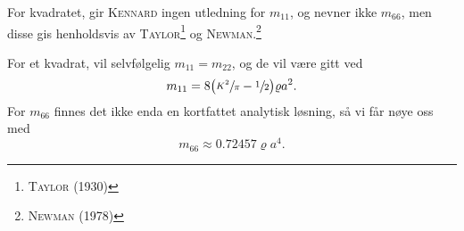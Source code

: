 For kvadratet, gir \textsc{Kennard} ingen utledning for $m_{11}$, og nevner ikke $m_{66}$, men disse gis henholdsvis av \textsc{Taylor}\footnote{\cite{taylor1930some} \textsc{Taylor} (1930)} og \textsc{Newman}.\footnote{\cite{newman1979added} \textsc{Newman} (1978)}

\vspace{2em}
For et kvadrat, vil selvfølgelig $m_{11} = m_{22}$, og de vil være gitt ved
\[
        m_{11} = 8\big( \sfrac{K^2}{\pi} - \sfrac{1}{2} \big) \varrho a^2.
\]
For $m_{66}$ finnes det ikke enda en kortfattet analytisk løsning, så vi får nøye oss med
\[
        m_{66} \approx 0.72457\varrho a^4.
\]
